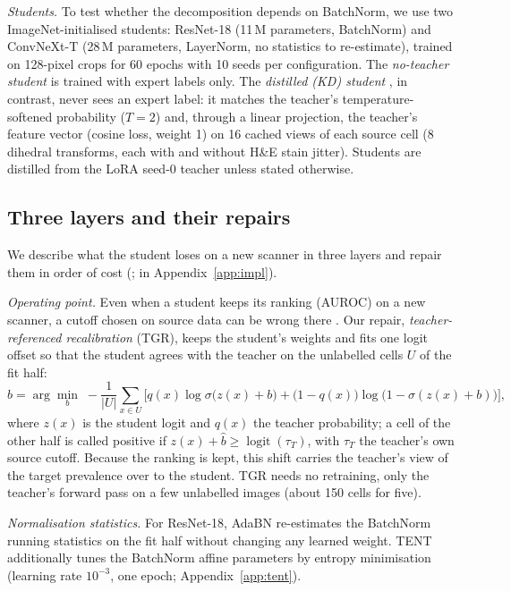 \emph{Students.} To test whether the decomposition depends on BatchNorm, we use two ImageNet-initialised students:
ResNet-18 \citep{he2016deep} (11\,M parameters, BatchNorm) and ConvNeXt-T \citep{liu2022convnet} (28\,M parameters,
LayerNorm, no statistics to re-estimate), trained on 128-pixel crops for 60 epochs with 10 seeds per configuration. The
\emph{no-teacher student} is trained with expert labels only. The \emph{distilled (KD) student}
\citep{hinton2015distilling}, in contrast, never sees an expert label: it matches the teacher's temperature-softened
probability ($T=2$) and, through a linear projection, the teacher's feature vector (cosine loss, weight 1) on 16 cached
views of each source cell (8 dihedral transforms, each with and without H\&E stain jitter). Students are distilled from
the LoRA seed-0 teacher unless stated otherwise.

\subsection{Three layers and their repairs}
\label{sec:layers}

We describe what the student loses on a new scanner in three layers and repair them in order of cost
(;  in Appendix~\ref{app:impl}).

\emph{Operating point.} Even when a student keeps its ranking (AUROC) on a new scanner, a cutoff chosen on source data
can be wrong there \citep{roschewitz2023automatic,thiringer2026scanner}. Our repair, \emph{teacher-referenced
recalibration} (TGR), keeps the student's weights and fits one logit offset so that the student agrees with the teacher
on the unlabelled cells $U$ of the fit half:
\begin{equation}
\hat b = \arg\min_b \; -\frac{1}{|U|}\sum_{x\in U}\Big[q(x)\log\sigma\big(z(x)+b\big) + \big(1-q(x)\big)\log\big(1-\sigma(z(x)+b)\big)\Big],
\label{eq:tgr}
\end{equation}
where $z(x)$ is the student logit and $q(x)$ the teacher probability; a cell of the other half is called positive if
$z(x)+\hat b \ge \operatorname{logit}(\tau_T)$, with $\tau_T$ the teacher's own source cutoff. Because the ranking is
kept, this shift carries the teacher's view of the target prevalence over to the student. TGR needs no retraining, only the
teacher's forward pass on a few unlabelled images (about 150 cells for five).

\emph{Normalisation statistics.} For ResNet-18, AdaBN \citep{li2018adaptive,schneider2020improving} re-estimates the
BatchNorm running statistics on the fit half without changing any learned weight. TENT \citep{wang2021tent} additionally
tunes the BatchNorm affine parameters by entropy minimisation (learning rate $10^{-3}$, one epoch; Appendix~\ref{app:tent}).

